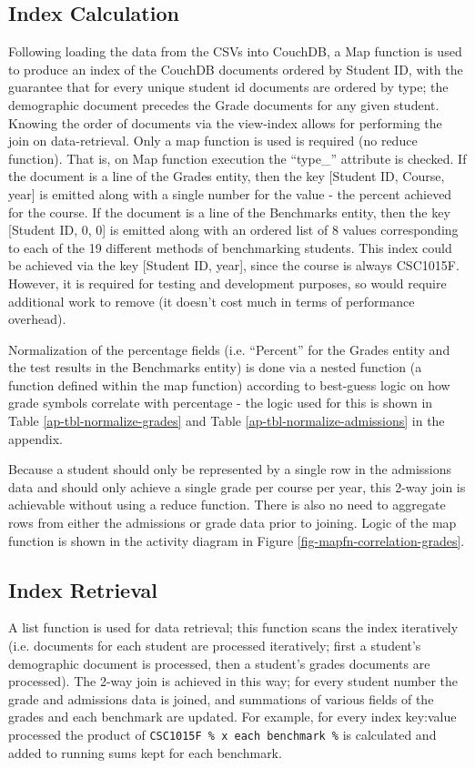 \subsection{Index Calculation}
Following loading the data from the CSVs into CouchDB, a Map function is used to produce an index of the CouchDB documents ordered by Student ID, with the guarantee that for every unique student id documents are ordered by type; the demographic document precedes the Grade documents for any given student. Knowing the order of documents via the view-index allows for performing the join on data-retrieval. Only a map function is used is required (no reduce function). That is, on Map function execution the ``type\_'' attribute is checked. If the document is a line of the Grades entity, then the key [Student ID, Course, year] is emitted along with a single number for the value - the percent achieved for the course. If the document is a line of the Benchmarks entity, then the key [Student ID, 0, 0] is emitted along with an ordered list of 8 values corresponding to each of the 19 different methods of benchmarking students. This index could be achieved via the key [Student ID, year], since the course is always CSC1015F. However, it is required for testing and development purposes, so would require additional work to remove (it doesn't cost much in terms of performance overhead).

Normalization of the percentage fields (i.e. ``Percent'' for the Grades entity and the test results in the Benchmarks entity) is done via a nested function (a function defined within the map function) according to best-guess logic on how grade symbols correlate with percentage - the logic used for this is shown in Table \ref{ap-tbl-normalize-grades} and Table \ref{ap-tbl-normalize-admissions} in the appendix.

Because a student should only be represented by a single row in the admissions data and should only achieve a single grade per course per year, this 2-way join is achievable without using a reduce function. There is also no need to aggregate rows from either the admissions or grade data prior to joining. Logic of the map function is shown in the activity diagram in Figure \ref{fig-mapfn-correlation-grades}.



\subsection{Index Retrieval}
A list function is used for data retrieval; this function scans the index iteratively (i.e. documents for each student are processed iteratively; first a student's demographic document is processed, then a student's grades documents are processed). The 2-way join is achieved in this way; for every student number the grade and admissions data is joined, and summations of various fields of the grades and each benchmark are updated. For example, for every index key:value processed the product of \texttt{CSC1015F \% x each benchmark \%} is calculated and added to running sums kept for each benchmark.

